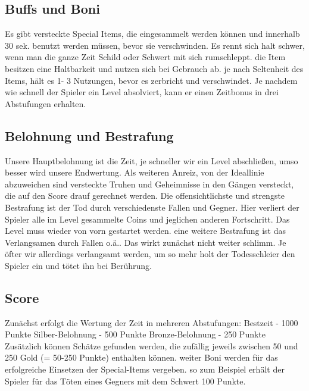 \documentclass{article}
\begin{document}
\subsection{Buffs und Boni}
Es gibt versteckte Special Items, die eingesammelt werden können und innerhalb 30 sek.
benutzt werden müssen, bevor sie verschwinden. Es rennt sich halt schwer, wenn man die
ganze Zeit Schild oder Schwert mit sich rumschleppt. die Item besitzen eine Haltbarkeit und
nutzen sich bei Gebrauch ab. je nach Seltenheit des Items, hält es 1- 3 Nutzungen, bevor es
zerbricht und verschwindet. \newline
Je nachdem wie schnell der Spieler ein Level absolviert, kann er einen Zeitbonus in drei Abstufungen erhalten.

\subsection{Belohnung und Bestrafung}
Unsere Hauptbelohnung ist die Zeit, je schneller wir ein Level abschließen, umso besser wird
unsere Endwertung. Als weiteren Anreiz, von der Ideallinie
abzuweichen sind versteckte Truhen und Geheimnisse in den Gängen versteckt, die auf den
Score drauf gerechnet werden. \newline
Die offensichtlichste und strengste Bestrafung ist der Tod durch verschiedenste Fallen und
Gegner. Hier verliert der Spieler alle im Level gesammelte Coins und jeglichen anderen Fortschritt. Das Level muss wieder von vorn gestartet werden. \newline
eine weitere Bestrafung ist das Verlangsamen durch Fallen o.ä.. Das wirkt zunächst nicht weiter schlimm. Je öfter wir allerdings verlangsamt werden, um so mehr holt der
Todesschleier den Spieler ein und tötet ihn bei Berührung.

\subsection{Score}
Zunächst erfolgt die Wertung der Zeit in mehreren Abstufungen:
Bestzeit - 1000 Punkte
Silber-Belohnung - 500 Punkte
Bronze-Belohnung - 250 Punkte
Zusätzlich können Schätze gefunden werden, die zufällig jeweils zwischen 50 und
250 Gold (= 50-250 Punkte) enthalten können.
weiter Boni werden für das erfolgreiche Einsetzen der Special-Items vergeben. so
zum Beispiel erhält der Spieler für das Töten eines Gegners mit dem Schwert 100
Punkte.
\end{document}

